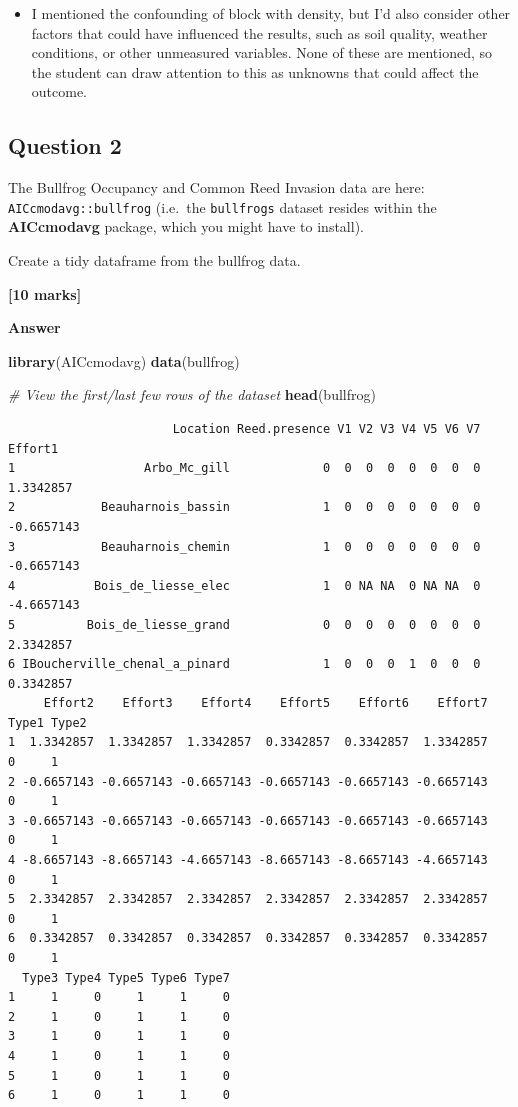 \documentclass[
  10t,
]{article}
\newenvironment{Shaded}{\begin{snugshade}}{\end{snugshade}}
\newcommand{\CommentTok}[1]{\textcolor[rgb]{0.56,0.35,0.01}{\textit{#1}}}
\newcommand{\FunctionTok}[1]{\textcolor[rgb]{0.13,0.29,0.53}{\textbf{#1}}}
\newcommand{\NormalTok}[1]{#1}
\providecommand{\tightlist}{%
  \setlength{\itemsep}{0pt}\setlength{\parskip}{0pt}}
\let\oldtexttt\texttt
\renewcommand{\texttt}[1]{\oldtexttt{\small #1}}
\begin{document}
\begin{itemize}
\tightlist
\item
  I mentioned the confounding of block with density, but I'd also
  consider other factors that could have influenced the results, such as
  soil quality, weather conditions, or other unmeasured variables. None
  of these are mentioned, so the student can draw attention to this as
  unknowns that could affect the outcome.
\end{itemize}

\subsection{Question 2}\label{question-2-1}

The Bullfrog Occupancy and Common Reed Invasion data are here:
\texttt{AICcmodavg::bullfrog} (i.e.~the \texttt{bullfrogs} dataset
resides within the \textbf{AICcmodavg} package, which you might have to
install).

Create a tidy dataframe from the bullfrog data.

\textbf{{[}10 marks{]}}

\textbf{Answer}

\begin{Shaded}
\begin{Highlighting}[]
\FunctionTok{library}\NormalTok{(AICcmodavg)}
\FunctionTok{data}\NormalTok{(bullfrog)}

\CommentTok{\# View the first/last few rows of the dataset}
\FunctionTok{head}\NormalTok{(bullfrog)}
\end{Highlighting}
\end{Shaded}

\begin{verbatim}
                       Location Reed.presence V1 V2 V3 V4 V5 V6 V7    Effort1
1                  Arbo_Mc_gill             0  0  0  0  0  0  0  0  1.3342857
2            Beauharnois_bassin             1  0  0  0  0  0  0  0 -0.6657143
3            Beauharnois_chemin             1  0  0  0  0  0  0  0 -0.6657143
4           Bois_de_liesse_elec             1  0 NA NA  0 NA NA  0 -4.6657143
5          Bois_de_liesse_grand             0  0  0  0  0  0  0  0  2.3342857
6 IBoucherville_chenal_a_pinard             1  0  0  0  1  0  0  0  0.3342857
     Effort2    Effort3    Effort4    Effort5    Effort6    Effort7 Type1 Type2
1  1.3342857  1.3342857  1.3342857  0.3342857  0.3342857  1.3342857     0     1
2 -0.6657143 -0.6657143 -0.6657143 -0.6657143 -0.6657143 -0.6657143     0     1
3 -0.6657143 -0.6657143 -0.6657143 -0.6657143 -0.6657143 -0.6657143     0     1
4 -8.6657143 -8.6657143 -4.6657143 -8.6657143 -8.6657143 -4.6657143     0     1
5  2.3342857  2.3342857  2.3342857  2.3342857  2.3342857  2.3342857     0     1
6  0.3342857  0.3342857  0.3342857  0.3342857  0.3342857  0.3342857     0     1
  Type3 Type4 Type5 Type6 Type7
1     1     0     1     1     0
2     1     0     1     1     0
3     1     0     1     1     0
4     1     0     1     1     0
5     1     0     1     1     0
6     1     0     1     1     0
\end{verbatim}
\end{document}
